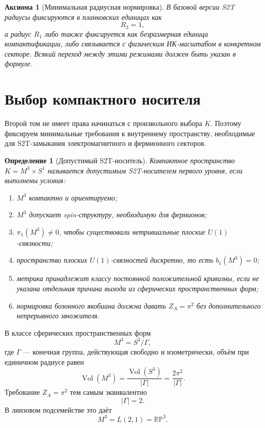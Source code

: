 \documentclass[12pt,a4paper]{report}
\newtheorem{definition}{Определение}[chapter]
\newtheorem{axiom}{Аксиома}[chapter]
\theoremstyle{remark}
\DeclareMathOperator{\Vol}{Vol}
\begin{document}
\begin{axiom}[Минимальная радиусная нормировка]
В базовой версии S2T радиусы фиксируются в планковских единицах как
\begin{equation}
    R_3=1,
\end{equation}
а радиус \(R_1\) либо также фиксируется как безразмерная единица компактификации, либо связывается с физическим ИК-масштабом в конкретном секторе. Всякий переход между этими режимами должен быть указан в формуле.
\end{axiom}

\section{Выбор компактного носителя}

Второй том не имеет права начинаться с произвольного выбора \(K\). Поэтому фиксируем минимальные требования к внутреннему пространству, необходимые для S2T-замыкания электромагнитного и фермионного секторов.

\begin{definition}[Допустимый S2T-носитель]
Компактное пространство \(K=M^3\times S^1\) называется допустимым S2T-носителем первого уровня, если выполнены условия:
\begin{enumerate}
    \item \(M^3\) компактно и ориентируемо;
    \item \(M^3\) допускает spin-структуру, необходимую для фермионов;
    \item \(\pi_1(M^3)\neq 0\), чтобы существовали нетривиальные плоские \(U(1)\)-связности;
    \item пространство плоских \(U(1)\)-связностей дискретно, то есть \(b_1(M^3)=0\);
    \item метрика принадлежит классу постоянной положительной кривизны, если не указана отдельная причина выхода из сферических пространственных форм;
    \item нормировка бозонного якобиана должна давать \(Z_A=\pi^2\) без дополнительного непрерывного множителя.
\end{enumerate}
\end{definition}

В классе сферических пространственных форм
\begin{equation}
    M^3=S^3/\Gamma,
\end{equation}
где \(\Gamma\) --- конечная группа, действующая свободно и изометрически, объём при единичном радиусе равен
\begin{equation}
    \Vol(M^3)=\frac{\Vol(S^3)}{|\Gamma|}=\frac{2\pi^2}{|\Gamma|}.
\end{equation}
Требование \(Z_A=\pi^2\) тем самым эквивалентно
\begin{equation}
    |\Gamma|=2.
\end{equation}
В линзовом подсемействе это даёт
\begin{equation}
    M^3=L(2,1)=\mathbb{RP}^3.
\end{equation}
\end{document}
